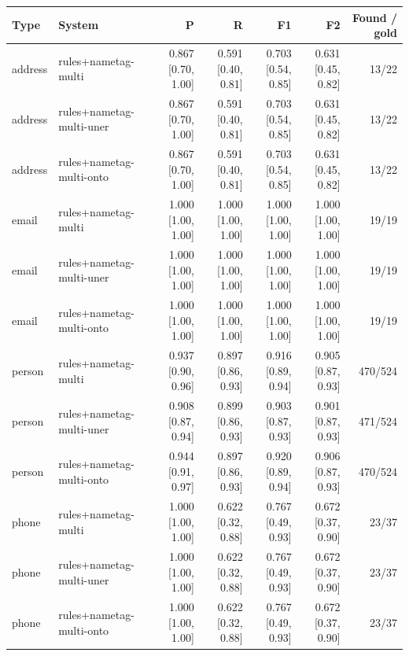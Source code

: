 \providecommand{\ci}[2]{{\scriptsize [#1, #2]}}

\begin{table}[htbp]
\centering
\small
\begin{tabular}{llrrrrr}
\toprule
Type & System & P & R & F1 & F2 & Found / gold \\
\midrule
address & rules+nametag-multi & 0.867 \ci{0.70}{1.00} & 0.591 \ci{0.40}{0.81} & 0.703 \ci{0.54}{0.85} & 0.631 \ci{0.45}{0.82} & 13/22 \\
address & rules+nametag-multi-uner & 0.867 \ci{0.70}{1.00} & 0.591 \ci{0.40}{0.81} & 0.703 \ci{0.54}{0.85} & 0.631 \ci{0.45}{0.82} & 13/22 \\
address & rules+nametag-multi-onto & 0.867 \ci{0.70}{1.00} & 0.591 \ci{0.40}{0.81} & 0.703 \ci{0.54}{0.85} & 0.631 \ci{0.45}{0.82} & 13/22 \\
email & rules+nametag-multi & 1.000 \ci{1.00}{1.00} & 1.000 \ci{1.00}{1.00} & 1.000 \ci{1.00}{1.00} & 1.000 \ci{1.00}{1.00} & 19/19 \\
email & rules+nametag-multi-uner & 1.000 \ci{1.00}{1.00} & 1.000 \ci{1.00}{1.00} & 1.000 \ci{1.00}{1.00} & 1.000 \ci{1.00}{1.00} & 19/19 \\
email & rules+nametag-multi-onto & 1.000 \ci{1.00}{1.00} & 1.000 \ci{1.00}{1.00} & 1.000 \ci{1.00}{1.00} & 1.000 \ci{1.00}{1.00} & 19/19 \\
person & rules+nametag-multi & 0.937 \ci{0.90}{0.96} & 0.897 \ci{0.86}{0.93} & 0.916 \ci{0.89}{0.94} & 0.905 \ci{0.87}{0.93} & 470/524 \\
person & rules+nametag-multi-uner & 0.908 \ci{0.87}{0.94} & 0.899 \ci{0.86}{0.93} & 0.903 \ci{0.87}{0.93} & 0.901 \ci{0.87}{0.93} & 471/524 \\
person & rules+nametag-multi-onto & 0.944 \ci{0.91}{0.97} & 0.897 \ci{0.86}{0.93} & 0.920 \ci{0.89}{0.94} & 0.906 \ci{0.87}{0.93} & 470/524 \\
phone & rules+nametag-multi & 1.000 \ci{1.00}{1.00} & 0.622 \ci{0.32}{0.88} & 0.767 \ci{0.49}{0.93} & 0.672 \ci{0.37}{0.90} & 23/37 \\
phone & rules+nametag-multi-uner & 1.000 \ci{1.00}{1.00} & 0.622 \ci{0.32}{0.88} & 0.767 \ci{0.49}{0.93} & 0.672 \ci{0.37}{0.90} & 23/37 \\
phone & rules+nametag-multi-onto & 1.000 \ci{1.00}{1.00} & 0.622 \ci{0.32}{0.88} & 0.767 \ci{0.49}{0.93} & 0.672 \ci{0.37}{0.90} & 23/37 \\

\end{tabular}
\end{table}

